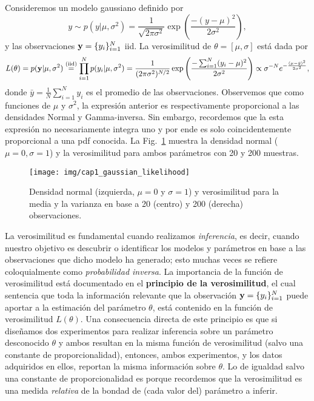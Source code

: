\begin{mdframed}[style=ejemplo, frametitle={\center Ejemplo: Verosimilitud para el modelo gaussiano  (muestras  independientes)}]

Consideremos un  modelo gaussiano definido por 
\begin{equation}
	y \sim p(y|\mu,\sigma^2) = \frac{1}{\sqrt{2\pi\sigma^2}}\exp\left(\frac{-(y-\mu)^2}{2\sigma^2}\right),
\end{equation}
y las observaciones $\mathbf{y} = \{y_i\}_{i=1}^N$ iid. La verosimilitud  de $\theta  =  [\mu,\sigma]$ está dada por 
\begin{equation}
  	L(\theta)  =  p(\mathbf{y}|\mu,\sigma^2) 
  				\stackrel{\text{(iid)}}{=}\prod_{i=1}^N p(y_i|\mu,\sigma^2) 
  				= \frac{1}{(2\pi\sigma^2)^{N/2}}  \exp\left(\frac{-\sum_{i=1}^N(y_i-\mu)^2}{2\sigma^2}\right)
  				\propto \sigma^{-N} e^{-\frac{(\mu-\bar y)^2}{2\sigma^2}},
  \end{equation}  
  donde $\bar y = \tfrac{1}{N}\sum_{i=1}^Ny_i$ es el promedio de las observaciones. Observemos que como funciones de $\mu$ y $\sigma^2$, la expresión anterior es respectivamente  proporcional a las densidades Normal y Gamma-inversa. Sin embargo, recordemos que la esta  expresión no necesariamente integra uno y por  ende es solo coincidentemente proporcional a una pdf conocida. La Fig.~\ref{fig:gaussian_likelihood} muestra la  densidad normal ($\mu=0,\sigma=1$) y la verosimilitud para ambos parámetros con 20 y 200 muestras. 

\begin{figure}[H]
	\centering
	\texttt{[image: img/cap1\_gaussian\_likelihood]}\\
	\caption{Densidad normal (izquierda, $\mu=0$ y $\sigma=1$) y verosimilitud para la media y la varianza en base a 20 (centro) y 200 (derecha) observaciones.}
	\label{fig:gaussian_likelihood}  
\end{figure}
  


\end{mdframed}

La verosimilitud es fundamental cuando realizamos \emph{inferencia}, es decir, cuando nuestro objetivo es descubrir o identificar los modelos y parámetros en base a las observaciones que dicho modelo ha generado; esto muchas veces se refiere coloquialmente como \emph{probabilidad inversa}. La importancia de la función de verosimilitud está documentado en el \textbf{principio de la verosimilitud}, el cual sentencia que toda la información relevante que la observación $\mathbf{y} = \{y_i\}_{i=1}^N$ puede aportar a la estimación del parámetro $\theta$, está contenido en la función  de verosimilitud $L(\theta)$. Una consecuencia directa de este principio es que si diseñamos dos experimentos para realizar  inferencia  sobre un parámetro desconocido $\theta$ y ambos  resultan en la misma función de verosimilitud  (salvo una constante de proporcionalidad), entonces,  ambos experimentos, y los datos adquiridos en  ellos, reportan la misma  información  sobre $\theta$. Lo de igualdad salvo una constante de proporcionalidad es porque recordemos que la verosimilitud es una medida \emph{relativa} de la bondad de (cada valor del) parámetro a inferir. 

